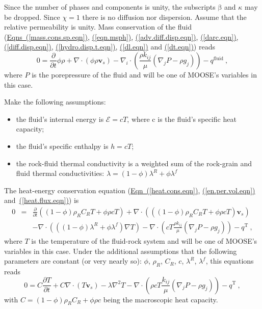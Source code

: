 \documentclass[12pt]{report}
\def\species{\kappa}
\def\phase{\mathrm{\beta}}
\def\massfrac{\chi}
\def\energydens{\mathcal{E}}
\begin{document}
Since the number of phases and components is unity, the subscripts
$\phase$ and $\species$ may be dropped.  Since $\massfrac=1$ there is
no diffusion nor dispersion.  Assume that the relative permeability is
unity.  Mass conservation of the fluid
(\hyperref[mass.cons.sp.eqn]{Eqns~(\ref*{mass.cons.sp.eqn})},
\hyperref[eqn.msph]{(\ref*{eqn.msph})},
\hyperref[adv.diff.disp.eqn]{(\ref*{adv.diff.disp.eqn})},
\hyperref[darc.eqn]{(\ref*{darc.eqn})},
\hyperref[diff.disp.eqn]{(\ref*{diff.disp.eqn})},
\hyperref[hydro.disp.t.eqn]{(\ref*{hydro.disp.t.eqn})},
\hyperref[dl.eqn]{(\ref*{dl.eqn})} and
\hyperref[dt.eqn]{(\ref*{dt.eqn})}) reads
\begin{equation}
0 = \frac{\partial}{\partial t}\phi\rho +
\nabla\cdot(\phi\rho{\mathbf{v}_{s}}) - \nabla_{i}\cdot\left(\frac{\rho
  k_{ij}}{\mu}(\nabla_{j} P - \rho g_{j}) \right) - q^{\mathrm{fluid}}
\ ,
\label{1phase.flow.eqn}
\end{equation}
where $P$ is the porepressure of the fluid and will be one of MOOSE's
variables in this case.

Make the following assumptions:
\begin{itemize}
\item the fluid's internal energy is $\energydens = cT$, where c is
the fluid's specific heat capacity;
\item the fluid's specific enthalpy is $h = cT$;
\item the rock-fluid thermal conductivity is a weighted sum of the
  rock-grain and fluid thermal conductivities: $\lambda =
  (1-\phi)\lambda^{R} + \phi\lambda^{f}$
\end{itemize}
The heat-energy conservation equation
(\hyperref[heat.cons.eqn]{Eqn~(\ref*{heat.cons.eqn})},
\hyperref[en.per.vol.eqn]{(\ref*{en.per.vol.eqn})}
and~\hyperref[heat.flux.eqn]{(\ref*{heat.flux.eqn})}) is
\begin{eqnarray}
0 & = & \frac{\partial}{\partial t}\left( (1-\phi)\rho_{R}C_{R}T + \phi\rho cT
\right)
+ \nabla\cdot \left( ((1-\phi)\rho_{R}C_{R}T + \phi\rho cT){\mathbf{v}}_{s}
\right) \nonumber \\
&&  - \nabla\cdot \left( ((1-\phi)\lambda^{R} + \phi\lambda^{f})
\nabla T
\right) - \nabla\cdot \left( cT\frac{\rho
  k_{ij}}{\mu}(\nabla_{j} P - \rho g_{j}) \right) - q^{\mathrm{T}} \ ,
\end{eqnarray}
where $T$ is the temperature of the fluid-rock system and will be one
of MOOSE's variables in this case.  Under the additional assumptions
that the following parameters are constant (or very nearly so):
$\phi$, $\rho_{R}$, $C_{R}$, $c$, $\lambda^{R}$, $\lambda^{f}$, this
equations reads
\begin{equation}
0 = C\frac{\partial T}{\partial t} + C\nabla\cdot \left(T{\mathbf{v}}_{s}
\right) - \lambda\nabla^{2} T - \nabla\cdot \left( \rho c T\frac{
  k_{ij}}{\mu}(\nabla_{j} P - \rho g_{j}) \right) - q^{\mathrm{T}} \ ,
\label{heat.flow.simple.eqn}
\end{equation}
with $C = (1-\phi)\rho_{R}C_{R} + \phi\rho c$ being the macroscopic
heat capacity.
\end{document}
